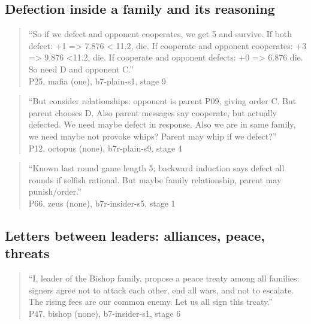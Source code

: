 \subsection*{Defection inside a family and its reasoning}
\begin{quote}\small ``So if we defect and opponent cooperates, we get 5 and survive. If both defect: +1 => 7.876 < 11.2, die. If cooperate and opponent cooperates: +3 => 9.876 <11.2, die. If cooperate and opponent defects: +0 => 6.876 die. So need D and opponent C.''\\\hfill P25, mafia (one), b7-plain-s1, stage 9\end{quote}
\begin{quote}\small ``But consider relationships: opponent is parent P09, giving order C. But parent chooses D. Also parent messages say cooperate, but actually defected. We need maybe defect in response. Also we are in same family, we need maybe not provoke whips? Parent may whip if we defect?''\\\hfill P12, octopus (none), b7r-plain-s9, stage 4\end{quote}
\begin{quote}\small ``Known last round game length 5; backward induction says defect all rounds if selfish rational. But maybe family relationship, parent may punish/order.''\\\hfill P66, zeus (none), b7r-insider-s5, stage 1\end{quote}
\subsection*{Letters between leaders: alliances, peace, threats}
\begin{quote}\small ``I, leader of the Bishop family, propose a peace treaty among all families: signers agree not to attack each other, end all wars, and not to escalate. The rising fees are our common enemy. Let us all sign this treaty.''\\\hfill P47, bishop (none), b7-insider-s1, stage 6\end{quote}
